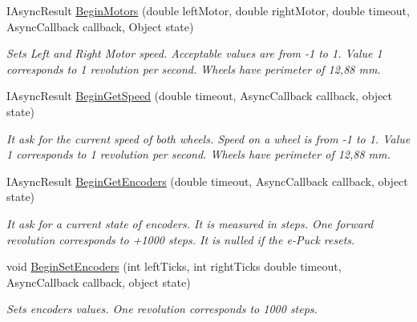 \begin{DoxyCompactItemize}
  \item IAsyncResult \hyperlink{class_elib_1_1_epuck_aaa46f6da4226876036df7ba7cf2adca3}{BeginMotors} (double leftMotor, double rightMotor, double timeout, AsyncCallback callback, Object state)
  \begin{DoxyCompactList}\small\item\em Sets Left and Right Motor speed. Acceptable values are from -\/1 to 1. Value 1 corresponds to 1 revolution per second. Wheels have perimeter of 12,88 mm. \item\end{DoxyCompactList}

  \item   IAsyncResult \hyperlink{class_elib_1_1_epuck_a26cd19a983186a23aa49d99106bd33d1}{BeginGetSpeed} (double timeout, AsyncCallback callback, object state)
  \begin{DoxyCompactList}\small\item\em It ask for the current speed of both wheels. Speed on a wheel is from -\/1 to 1. Value 1 corresponds to 1 revolution per second. Wheels have perimeter of 12,88 mm. \item\end{DoxyCompactList}

  \item  IAsyncResult \hyperlink{class_elib_1_1_epuck_ad4cfe3776708816e78a7c53ddde315fb}{BeginGetEncoders} (double timeout, AsyncCallback callback, object state)
  \begin{DoxyCompactList}\small\item\em It ask for a current state of encoders. It is measured in steps. One forward revolution corresponds to +1000 steps.
  It is nulled if the e-\/Puck resets. \item\end{DoxyCompactList}

  \item void \hyperlink{class_elib_1_1_epuck_a8b0942a1bbf1b78115b0eedf77e535a0}{BeginSetEncoders} (int leftTicks, int rightTicks double timeout, AsyncCallback callback, object state)
  \begin{DoxyCompactList}\small\item\em Sets encoders values. One revolution corresponds to 1000 steps. \item\end{DoxyCompactList}

  \end{DoxyCompactItemize}

